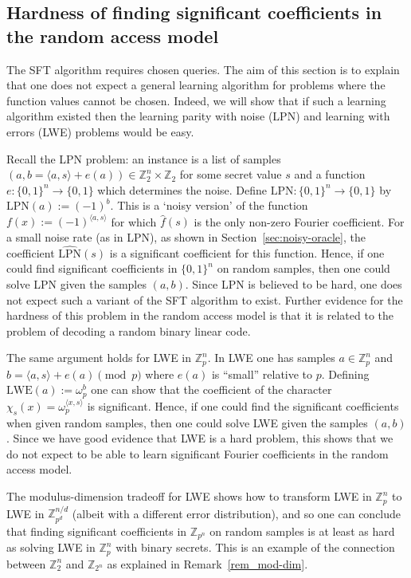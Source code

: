 \documentclass[11pt]{article}
\theoremstyle{definition}
\newcommand{\Z}{\mathbb{Z}}
\def\wp{\omega_p}
\begin{document}
\subsection{Hardness of finding significant coefficients in the random access model}
\label{sec:hardness-LPN}

The SFT algorithm requires chosen queries. The aim of this section is to explain that one does not expect a general learning algorithm for problems where the function values cannot be chosen.
Indeed, we will show that if such a learning algorithm existed then the learning parity with noise (LPN) and learning with errors (LWE) problems would be easy.

Recall the LPN problem: an instance is a list of samples $(a, b = \langle a,s \rangle + e(a)) \in \Z_2^n \times \Z_2$ for some secret value $s$ and a function $e :\{0,1\}^n \to \{0,1\}$ which determines the noise.
Define $\text{LPN} :\{0,1\}^n \to \{0,1\}$  by $\text{LPN}(a) := (-1)^b$. This is a `noisy version' of the function $f(x):=(-1)^{\langle a,s \rangle}$ for which $\widehat{f}(s)$ is the only non-zero Fourier coefficient. For a small noise rate (as in LPN), as shown in Section~\ref{sec:noisy-oracle}, the coefficient $\widehat{\text{LPN}}(s)$ is a significant coefficient for this function. Hence, if one could find significant coefficients in $\{0,1\}^n$ on random samples, then one could solve LPN given the samples $(a,b)$. Since LPN is believed to be hard, one does not expect such a variant of the SFT algorithm to exist. Further evidence for the hardness of this problem in the random access model is that it is related to the problem of decoding a random binary linear code.

The same argument holds for LWE in $\Z^n_p$. In LWE one has samples $a \in \Z_p^n$ and $b = \langle a, s \rangle + e(a) \pmod{p}$ where $e(a)$ is ``small'' relative to $p$. Defining $\text{LWE}(a) := \wp^b$ one can show that the coefficient of the character $\chi_s(x) = \wp^{\langle x, s \rangle}$ is significant. Hence, if one could find the significant coefficients when given random samples, then one could solve LWE given the samples $(a,b)$. Since we  have good evidence that LWE is a hard problem, this shows that we do not expect to be able to learn significant Fourier coefficients in the random access model.

The modulus-dimension tradeoff for LWE \cite{mod-dim} shows how to transform LWE in $\Z^n_p$ to LWE in $\Z^{n/d}_{p^d}$ (albeit with a different error distribution), and so one can conclude that finding significant coefficients in $\Z_{p^n}$ on random samples is at least as hard as solving LWE in $\Z^n_p$ with binary secrets.
This is an example of the connection between $\Z_2^n$ and $\Z_{2^n}$ as explained in Remark~\ref{rem_mod-dim}.
\end{document}
